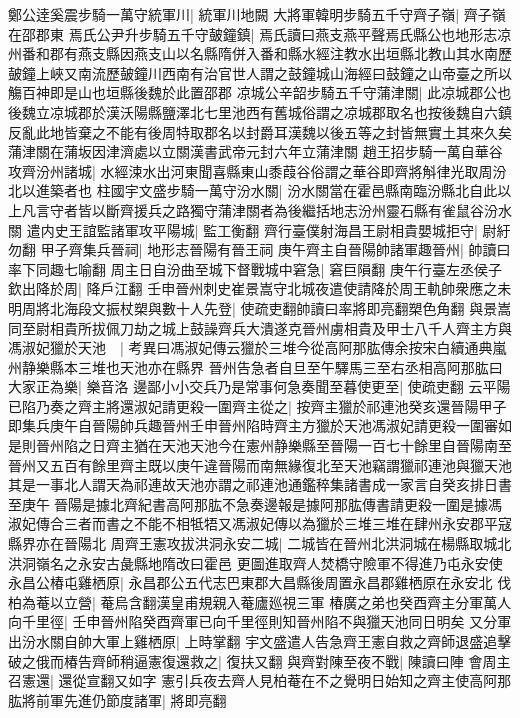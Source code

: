 鄭公逹奚震步騎一萬守統軍川|{
	統軍川地闕}
大將軍韓明步騎五千守齊子嶺|{
	齊子嶺在邵郡東}
焉氏公尹升步騎五千守皷鐘鎮|{
	焉氏讀曰燕支燕平聲焉氏縣公也地形志凉州番和郡有燕支縣因燕支山以名縣隋併入番和縣水經注教水出垣縣北教山其水南歷皷鐘上峽又南流歷皷鐘川西南有治官世人謂之鼓鐘城山海經曰鼓鐘之山帝臺之所以觴百神即是山也垣縣後魏於此置邵郡}
凉城公辛韶步騎五千守蒲津關|{
	此凉城郡公也後魏立凉城郡於漢沃陽縣鹽澤北七里池西有舊城俗謂之凉城郡取名也按後魏自六鎮反亂此地皆棄之不能有後周特取郡名以封爵耳漢魏以後五等之封皆無實土其來久矣蒲津關在蒲坂因津濟處以立關漢書武帝元封六年立蒲津關}
趙王招步騎一萬自華谷攻齊汾州諸城|{
	水經涑水出河東聞喜縣東山黍葭谷俗謂之華谷即齊將斛律光取周汾北以進築者也}
柱國宇文盛步騎一萬守汾水關|{
	汾水關當在霍邑縣南臨汾縣北自此以上凡言守者皆以斷齊援兵之路獨守蒲津關者為後繼括地志汾州靈石縣有雀鼠谷汾水關}
遣内史王誼監諸軍攻平陽城|{
	監工衡翻}
齊行臺僕射海昌王尉相貴嬰城拒守|{
	尉紆勿翻}
甲子齊集兵晉祠|{
	地形志晉陽有晉王祠}
庚午齊主自晉陽帥諸軍趣晉州|{
	帥讀曰率下同趣七喻翻}
周主日自汾曲至城下督戰城中窘急|{
	窘巨隕翻}
庚午行臺左丞侯子欽出降於周|{
	降戶江翻}
壬申晉州刺史崔景嵩守北城夜遣使請降於周王軌帥衆應之未明周將北海段文振杖槊與數十人先登|{
	使疏吏翻帥讀曰率將即亮翻槊色角翻}
與景嵩同至尉相貴所拔佩刀劫之城上鼓譟齊兵大潰遂克晉州虜相貴及甲士八千人齊主方與馮淑妃獵於天池　|{
	考異曰馮淑妃傳云獵於三堆今從高阿那肱傳余按宋白續通典嵐州静樂縣本三堆也天池亦在縣界}
晉州告急者自旦至午驛馬三至右丞相高阿那肱曰大家正為樂|{
	樂音洛}
邊鄙小小交兵乃是常事何急奏聞至暮使更至|{
	使疏吏翻}
云平陽已陷乃奏之齊主將還淑妃請更殺一圍齊主從之|{
	按齊主獵於祁連池癸亥還晉陽甲子即集兵庚午自晉陽帥兵趣晉州壬申晉州陷時齊主方獵於天池馮淑妃請更殺一圍審如是則晉州陷之日齊主猶在天池天池今在憲州静樂縣至晉陽一百七十餘里自晉陽南至晉州又五百有餘里齊主既以庚午違晉陽而南無緣復北至天池竊謂獵祁連池與獵天池其是一事北人謂天為祁連故天池亦謂之祁連池通鑑稡集諸書成一家言自癸亥排日書至庚午晉陽是據北齊紀書高阿那肱不急奏邊報是據阿那肱傳書請更殺一圍是據馮淑妃傳合三者而書之不能不相牴牾又馮淑妃傳以為獵於三堆三堆在肆州永安郡平寇縣界亦在晉陽北}
周齊王憲攻拔洪洞永安二城|{
	二城皆在晉州北洪洞城在楊縣取城北洪洞嶺名之永安古彘縣地隋改曰霍邑}
更圖進取齊人焚橋守險軍不得進乃屯永安使永昌公椿屯雞栖原|{
	永昌郡公五代志巴東郡大昌縣後周置永昌郡雞栖原在永安北}
伐柏為菴以立營|{
	菴烏含翻漢皇甫規親入菴廬廵視三軍}
椿廣之弟也癸酉齊主分軍萬人向千里徑|{
	壬申晉州陷癸酉齊軍已向千里徑則知晉州陷不與獵天池同日明矣}
又分軍出汾水關自帥大軍上雞栖原|{
	上時掌翻}
宇文盛遣人告急齊王憲自救之齊師退盛追擊破之俄而椿告齊師稍逼憲復還救之|{
	復扶又翻}
與齊對陳至夜不戰|{
	陳讀曰陣}
會周主召憲還|{
	還從宣翻又如字}
憲引兵夜去齊人見柏菴在不之覺明日始知之齊主使高阿那肱將前軍先進仍節度諸軍|{
	將即亮翻}
